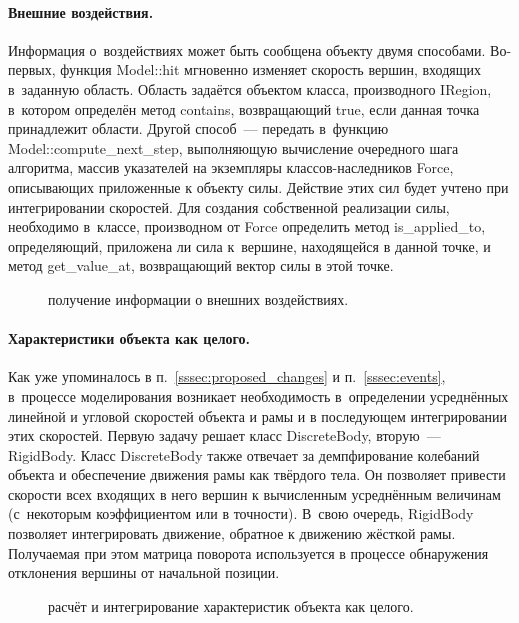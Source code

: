 \documentclass[a4paper, 14pt, titlepage]{extarticle}
\newcommand{\includefigure}[3][]{
    \begin{figure}[!htb]
      \center{\texttt{[image: \#2]}}
      \caption{#3} \label{fig:#2}
    \end{figure}
  }
\begin{document}
        \paragraph{Внешние воздействия.}
        Информация о~воздействиях может быть сообщена объекту двумя способами. Во-первых,
        функция Model::hit мгновенно изменяет скорость вершин, входящих в~заданную область. Область
        задаётся объектом класса, производного IRegion, в~котором определён метод contains,
        возвращающий true, если данная точка принадлежит области. Другой способ~--- передать в~функцию
        Model::compute\_next\_step, выполняющую вычисление очередного шага алгоритма, массив указателей
        на экземпляры классов-наследников Force, описывающих приложенные к объекту силы. Действие этих
        сил будет учтено при интегрировании скоростей. Для создания собственной реализации силы,
        необходимо в~классе, производном от Force определить метод is\_applied\_to, определяющий,
        приложена ли сила к~вершине, находящейся в данной точке, и метод get\_value\_at,
        возвращающий вектор силы в этой точке.

        \includefigure{core-interaction}{получение информации о внешних воздействиях.}

        \paragraph{Характеристики объекта как целого.}
        Как уже упоминалось в п.~\ref{sssec:proposed_changes} и п.~\ref{sssec:events}, в~процессе
        моделирования возникает необходимость в~определении усреднённых линейной и угловой скоростей
        объекта и рамы и в последующем интегрировании этих скоростей. Первую задачу решает класс
        DiscreteBody, вторую~--- RigidBody. Класс DiscreteBody также отвечает за демпфирование колебаний
        объекта и обеспечение движения рамы как твёрдого тела. Он позволяет привести скорости всех
        входящих в него вершин к вычисленным усреднённым величинам (с~некоторым коэффициентом или в
        точности). В~свою очередь, RigidBody позволяет интегрировать движение, обратное
        к движению жёсткой рамы. Получаемая при этом матрица поворота используется в процессе
        обнаружения отклонения вершины от начальной позиции.

        \includefigure{core-bodies}{расчёт и интегрирование характеристик объекта как целого.}
\end{document}
